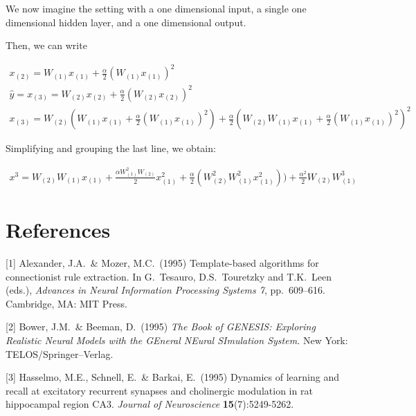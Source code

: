 \documentclass{article}
\begin{document}
We now imagine the setting with a one dimensional input, a single one dimensional hidden layer, and a one dimensional output.

Then, we can write

\begin{align}
x_{(2)} = W_{(1)}x_{(1)} + \frac{\alpha}{2} (W_{(1)} x_{(1)})^{2} \\
\hat{y} = x_{(3)} = W_{(2)}x_{(2)} + \frac{\alpha}{2} (W_{(2)} x_{(2)})^{2} \\
x_{(3)} = W_{(2)}(W_{(1)}x_{(1)} + \frac{\alpha}{2} (W_{(1)} x_{(1)})^{2}) + \frac{\alpha}{2} (W_{(2)} W_{(1)}x_{(1)} + \frac{\alpha}{2} (W_{(1)} x_{(1)})^{2})^{2}
\end{align}


Simplifying and grouping the last line, we obtain:

\begin{align}
x^{3} = W_{(2)}W_{(1)}x_{(1)} + \frac{\alpha {W_{(1)}^{2} W_{(2)}}}{2} x_{(1)}^{2} + \frac{\alpha}{2}(W^{2}_{(2)} W^{2}_{(1)} x_{(1)}^{2})) + \frac{\alpha^{2}}{2} W_{(2)} W^{3}_{(1)}
\end{align}


\section*{References}


{
\small


[1] Alexander, J.A.\ \& Mozer, M.C.\ (1995) Template-based algorithms for
connectionist rule extraction. In G.\ Tesauro, D.S.\ Touretzky and T.K.\ Leen
(eds.), {\it Advances in Neural Information Processing Systems 7},
pp.\ 609--616. Cambridge, MA: MIT Press.


[2] Bower, J.M.\ \& Beeman, D.\ (1995) {\it The Book of GENESIS: Exploring
  Realistic Neural Models with the GEneral NEural SImulation System.}  New York:
TELOS/Springer--Verlag.


[3] Hasselmo, M.E., Schnell, E.\ \& Barkai, E.\ (1995) Dynamics of learning and
recall at excitatory recurrent synapses and cholinergic modulation in rat
hippocampal region CA3. {\it Journal of Neuroscience} {\bf 15}(7):5249-5262.
}

\end{document}
